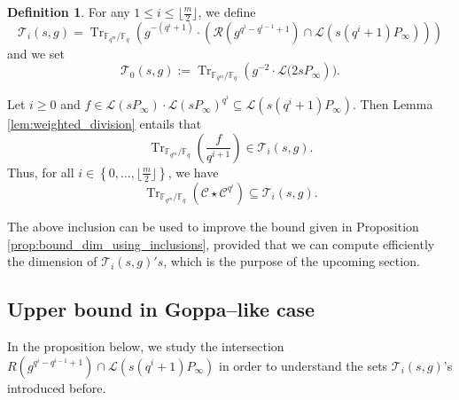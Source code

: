 \documentclass[a4paper]{article}
\theoremstyle{definition}
\newtheorem{definition}[thm]{Definition}
\theoremstyle{remark}
\newcommand{\calL}{\mathcal{L}}
\newcommand{\calC}{\mathcal{C}}
\newcommand{\calR}{\mathcal{R}}
\newcommand{\calT}{\mathcal{T}}
\newcommand{\fq}{\mathbb{F}_{q}}
\newcommand{\Tr}[1]{\operatorname{Tr}_{\mathbb{F}_{q^m}/\fq}\left(#1\right)}
\newcommand{\set}[1]{\left\{#1\right\}}
\begin{document}
\begin{definition} \label{def:T_i's}
For any $1 \leq i \leq \lfloor\frac{m}{2}\rfloor$, we define
$$\calT_i(s,g)= \Tr{g^{-(q^i+1)}\cdot \left( \calR\left(g^{q^i-q^{i-1}+1}\right)  \cap \calL(s(q^i+1)P_\infty)\right)}$$
and we set $$\calT_0(s,g) := \Tr{g^{-2} \cdot \calL(2sP_\infty}).$$
\end{definition}


\noindent Let $i \geq 0$ and $f \in \calL(sP_\infty) \cdot \calL(sP_\infty)^{q^i} \subseteq \calL(s(q^i+1)P_\infty)$. Then 
Lemma \ref{lem:weighted_division} entails that 
$$\Tr{\dfrac{f}{q^{i+1}}} \in \calT_i(s,g).$$
Thus, for all $i \in \set{0,\dots,\lfloor \frac{m}{2} \rfloor}$, we have \begin{equation} \label{eq:Tr(C*C^q^i)_dans_T_i}
\Tr{\calC \star \calC^{q^i}} \subseteq \calT_i(s,g).
\end{equation}

\noindent The above inclusion can be used to improve the bound given in Proposition \ref{prop:bound_dim_using_inclusions}, provided that we can compute efficiently the dimension of $\calT_i(s,g)'s$, which is the purpose of the upcoming section.


\subsection{Upper bound in Goppa--like case}

In the proposition below, we study the intersection $R(g^{q^{i}-q^{i-1}+1}) \cap \calL(s(q^i+1)P_\infty)$ in order to understand the sets $\calT_i(s,g)$'s introduced before.
\end{document}
